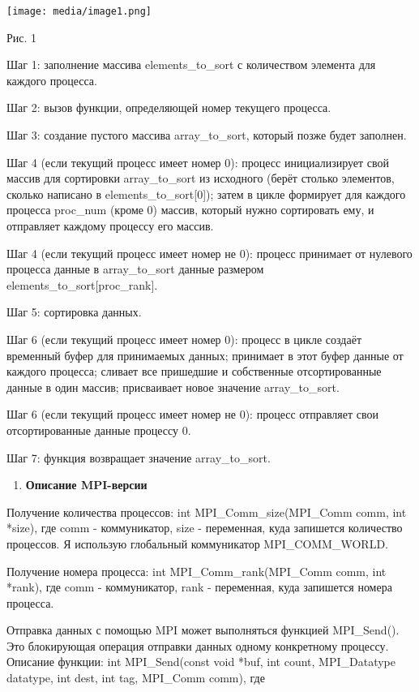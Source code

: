\documentclass[]{article}
\begin{document}
\texttt{[image: media/image1.png]}

Рис. 1

Шаг 1: заполнение массива elements\_to\_sort с количеством элемента для
каждого процесса.

Шаг 2: вызов функции, определяющей номер текущего процесса.

Шаг 3: создание пустого массива array\_to\_sort, который позже будет
заполнен.

Шаг 4 (если текущий процесс имеет номер 0): процесс инициализирует свой
массив для сортировки array\_to\_sort из исходного (берёт столько
элементов, сколько написано в elements\_to\_sort{[}0{]}); затем в цикле
формирует для каждого процесса proc\_num (кроме 0) массив, который нужно
сортировать ему, и отправляет каждому процессу его массив.

Шаг 4 (если текущий процесс имеет номер не 0): процесс принимает от
нулевого процесса данные в array\_to\_sort данные размером
elements\_to\_sort{[}proc\_rank{]}.

Шаг 5: сортировка данных.

Шаг 6 (если текущий процесс имеет номер 0): процесс в цикле создаёт
временный буфер для принимаемых данных; принимает в этот буфер данные от
каждого процесса; сливает все пришедшие и собственные отсортированные
данные в один массив; присваивает новое значение array\_to\_sort.

Шаг 6 (если текущий процесс имеет номер не 0): процесс отправляет свои
отсортированные данные процессу 0.

Шаг 7: функция возвращает значение array\_to\_sort.\textbf{\\
}

\begin{enumerate}
\def\labelenumi{\arabic{enumi}.}
\setcounter{enumi}{1}
\item
  \textbf{Описание MPI-версии}
\end{enumerate}

Получение количества процессов: int MPI\_Comm\_size(MPI\_Comm comm, int
*size), где comm - коммуникатор, size - переменная, куда запишется
количество процессов. Я использую глобальный коммуникатор
MPI\_COMM\_WORLD.

Получение номера процесса: int MPI\_Comm\_rank(MPI\_Comm comm, int
*rank), где comm - коммуникатор, rank - переменная, куда запишется
номера процесса.

Отправка данных с помощью MPI может выполняться функцией MPI\_Send().
Это блокирующая операция отправки данных одному конкретному процессу.
Описание функции: int MPI\_Send(const void *buf, int count,
MPI\_Datatype datatype, int dest, int tag, MPI\_Comm comm), где
\end{document}
